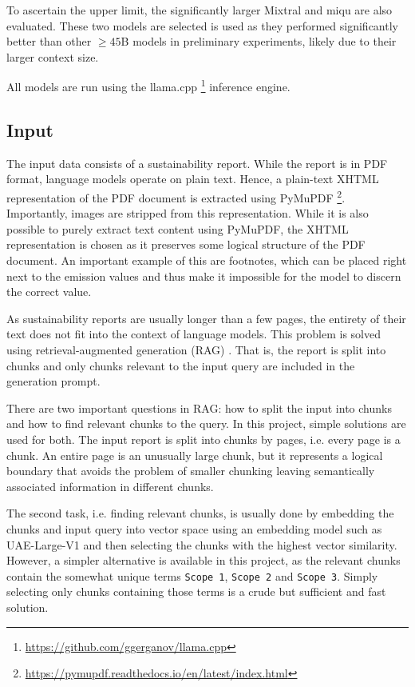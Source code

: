 \documentclass[]{article}
\begin{document}
To ascertain the upper limit, the significantly larger Mixtral and miqu are also evaluated. These two models are selected is used as they performed significantly better than other $\geq45$B models in preliminary experiments, likely due to their larger context size.

All models are run using the llama.cpp \footnote{\url{https://github.com/ggerganov/llama.cpp}} inference engine.

\subsection{Input}

The input data consists of a sustainability report. While the report is in PDF format, language models operate on plain text. Hence, a plain-text XHTML representation of the PDF document is extracted using PyMuPDF \footnote{\url{https://pymupdf.readthedocs.io/en/latest/index.html}}. Importantly, images are stripped from this representation. While it is also possible to purely extract text content using PyMuPDF, the XHTML representation is chosen as it preserves some logical structure of the PDF document. An important example of this are footnotes, which can be placed right next to the emission values and thus make it impossible for the model to discern the correct value.

As sustainability reports are usually longer than a few pages, the entirety of their text does not fit into the context of language models. This problem is solved using retrieval-augmented generation (RAG) \cite{DBLP:conf/nips/LewisPPPKGKLYR020}. That is, the report is split into chunks and only chunks relevant to the input query are included in the generation prompt.

There are two important questions in RAG: how to split the input into chunks and how to find relevant chunks to the query. In this project, simple solutions are used for both. The input report is split into chunks by pages, i.e. every page is a chunk. An entire page is an unusually large chunk, but it represents a logical boundary that avoids the problem of smaller chunking leaving semantically associated information in different chunks.

The second task, i.e. finding relevant chunks, is usually done by embedding the chunks and input query into vector space using an embedding model such as UAE-Large-V1 \cite{li2023angle} and then selecting the chunks with the highest vector similarity. However, a simpler alternative is available in this project, as the relevant chunks contain the somewhat unique terms \texttt{Scope 1}, \texttt{Scope 2} and \texttt{Scope 3}. Simply selecting only chunks containing those terms is a crude but sufficient and fast solution.
\end{document}
